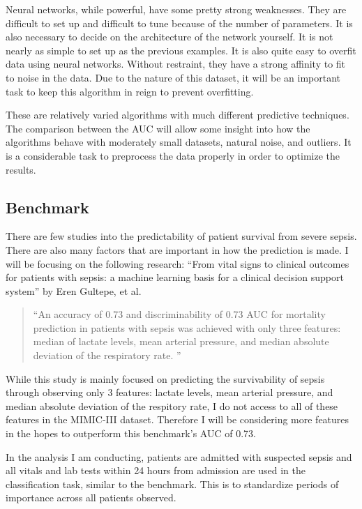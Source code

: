 \documentclass[11pt]{article}
\begin{document}
\begin{enumerate}
		Neural networks, while powerful, have some pretty strong weaknesses. They are difficult to set up and difficult to tune because of the number of parameters. It is also necessary to decide on the architecture of the network yourself. It is not nearly as simple to set up as the previous examples. It is also quite easy to overfit data using neural networks. Without restraint, they have a strong affinity to fit to noise in the data. Due to the nature of this dataset, it will be an important task to keep this algorithm in reign to prevent overfitting.
	\end{enumerate}
	
	These are relatively varied algorithms with much different predictive techniques. The comparison between the AUC will allow some insight into how the algorithms behave with moderately small datasets, natural noise, and outliers. It is a considerable task to preprocess the data properly in order to optimize the results.
	
	\subsection{Benchmark}
	There are few studies into the predictability of patient survival from severe sepsis. There are also many factors that are important in how the prediction is made. I will be focusing on the following research: ``From vital signs to clinical outcomes for patients with sepsis: a machine learning basis for a clinical decision support system'' by Eren Gultepe, et al. 
	\begin{quotation}
		``An accuracy of 0.73 and discriminability of 0.73 AUC for mortality prediction in patients with sepsis was achieved with only three features: median of lactate levels, mean arterial pressure, and median absolute deviation of the respiratory rate. ''\cite{sepsisresearch2}
	\end{quotation}
	
	While this study is mainly focused on predicting the survivability of sepsis through observing only 3 features: lactate levels, mean arterial pressure, and median absolute deviation of the respitory rate, I do not access to all of these features in the MIMIC-III dataset. Therefore I will be considering more features in the hopes to outperform this benchmark's AUC of 0.73. 
	
	In the analysis I am conducting, patients are admitted with suspected sepsis and all vitals and lab tests within 24 hours from admission are used in the classification task, similar to the benchmark. This is to standardize periods of importance across all patients observed.
	
\end{document}
